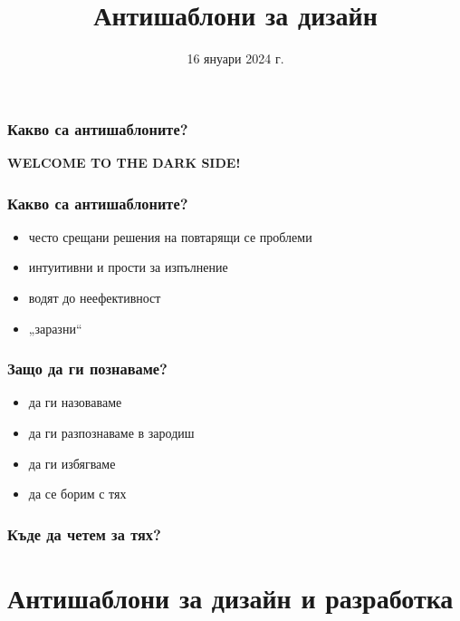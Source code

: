 \documentclass[alsotrans]{beamerswitch}
\title{Антишаблони за дизайн}
\date{16 януари 2024 г.}
\begin{document}
\begin{frame}
  \titlepage
\end{frame}

\begin{frame}
  \frametitle{Какво са антишаблоните?}

  \begin{center}

    \LARGE \textbf{WELCOME TO THE DARK SIDE!}
  \end{center}
\end{frame}

\begin{frame}
  \frametitle{Какво са антишаблоните?}

  \begin{itemize}
  \item често срещани решения на повтарящи се проблеми
  \item интуитивни и прости за изпълнение
  \item водят до неефективност
  \item „заразни“
  \end{itemize}
\end{frame}

\begin{frame}
  \frametitle{Защо да ги познаваме?}

  \begin{itemize}
  \item да ги назоваваме
  \item да ги разпознаваме в зародиш
  \item да ги избягваме
  \item да се борим с тях
  \end{itemize}
\end{frame}

\begin{frame}
  \frametitle{Къде да четем за тях?}
  \nocite{*}
  
  
\end{frame}

\section{Антишаблони за дизайн и разработка}
\end{document}
